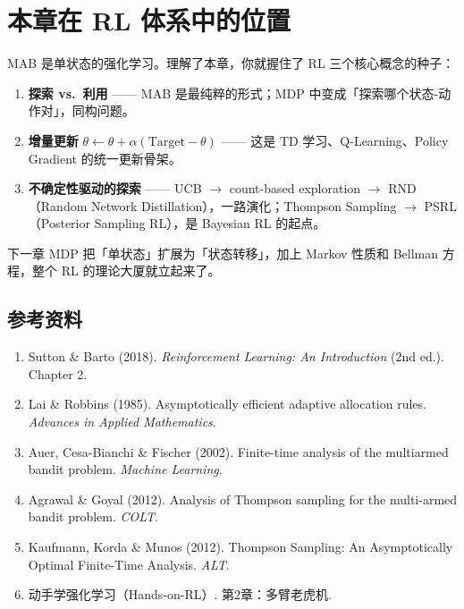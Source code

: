 \documentclass{article}
\begin{document}
\section*{本章在 RL 体系中的位置}

MAB 是单状态的强化学习。理解了本章，你就握住了 RL 三个核心概念的种子：

\begin{enumerate}
  \item \textbf{探索 vs.\ 利用} —— MAB 是最纯粹的形式；MDP 中变成「探索哪个状态-动作对」，同构问题。
  \item \textbf{增量更新} $\theta \leftarrow \theta + \alpha(\text{Target} - \theta)$ —— 这是 TD 学习、Q-Learning、Policy Gradient 的统一更新骨架。
  \item \textbf{不确定性驱动的探索} —— UCB $\to$ count-based exploration $\to$ RND（Random Network Distillation），一路演化；Thompson Sampling $\to$ PSRL（Posterior Sampling RL），是 Bayesian RL 的起点。
\end{enumerate}

下一章 MDP 把「单状态」扩展为「状态转移」，加上 Markov 性质和 Bellman 方程，整个 RL 的理论大厦就立起来了。

\subsection*{参考资料}

\begin{enumerate}
  \item Sutton \& Barto (2018). \textit{Reinforcement Learning: An Introduction} (2nd ed.). Chapter 2.
  \item Lai \& Robbins (1985). Asymptotically efficient adaptive allocation rules. \textit{Advances in Applied Mathematics}.
  \item Auer, Cesa-Bianchi \& Fischer (2002). Finite-time analysis of the multiarmed bandit problem. \textit{Machine Learning}.
  \item Agrawal \& Goyal (2012). Analysis of Thompson sampling for the multi-armed bandit problem. \textit{COLT}.
  \item Kaufmann, Korda \& Munos (2012). Thompson Sampling: An Asymptotically Optimal Finite-Time Analysis. \textit{ALT}.
  \item 动手学强化学习（Hands-on-RL）. 第2章：多臂老虎机.
\end{enumerate}
\end{document}

